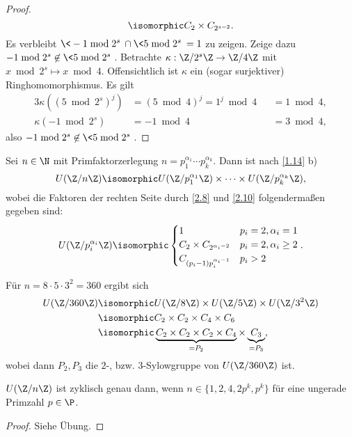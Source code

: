\begin{st}
\begin{proof}
\[			\isomorphic C_2 \times C_{2^{s-2}}.
		\]
		Es verbleibt $\<-1 \bmod 2^s\> \cap \<5 \bmod 2^s\> = 1$ zu zeigen.
		Zeige dazu $-1 \bmod 2^s \not\in \< 5 \bmod 2^s \>$.
		Betrachte $\kappa: \Z / 2^s \Z \to \Z / 4 \Z$ mit $x \bmod 2^s \mapsto x \bmod 4$.
		Offensichtlich ist $\kappa$ ein (sogar surjektiver) Ringhomomorphismus.
		Es gilt
		\begin{alignat*}{3}
			\kappa((5 \bmod 2^s)^j) &= (5 \bmod 4)^j = 1^j \bmod 4 &&= 1 \bmod 4, \\
			\kappa(-1 \bmod 2^s) &= -1 \bmod 4 &&= 3 \bmod 4,
		\end{alignat*}
		also $-1 \bmod 2^s \not\in \< 5 \bmod 2^s\>$.
	\end{proof}
\end{st}

\begin{kor} \label{2.11}
	Sei $n \in \N$ mit Primfaktorzerlegung $n = p_1^{\alpha_1} \dotsb p_k^{\alpha_k}$.
	Dann ist nach \ref{1.14} b)
	\[
		U(\Z / n\Z) \isomorphic U(\Z / p_1^{\alpha_1}\Z) \times \dotsb \times U(\Z / p_k^{\alpha_k} \Z),
	\]
	wobei die Faktoren der rechten Seite durch \ref{2.8} und \ref{2.10} folgendermaßen gegeben sind:
	\[
		U(\Z / p_i^{\alpha_i} \Z)
		\isomorphic \begin{cases}
			1 & p_i = 2, \alpha_i = 1 \\
			C_2 \times C_{2^{\alpha_i - 2}} & p_i = 2, \alpha_i \ge 2 \\
			C_{(p_i-1)p_i^{\alpha_i - 1}} & p_i > 2
		\end{cases}.
	\]
\end{kor}

\begin{ex*}
	Für $n = 8 \cdot 5 \cdot 3^2 = 360$ ergibt sich
	\begin{align*}
		U(\Z / 360 \Z)
		&\isomorphic U(\Z / 8 \Z) \times U(\Z / 5 \Z) \times U(\Z / 3^2 \Z) \\
		&\isomorphic C_2 \times C_2 \times C_4 \times C_6 \\
		&\isomorphic \underbrace{C_2 \times C_2 \times C_2 \times  C_4}_{=P_2} \times \underbrace{C_3}_{=P_3},
	\end{align*}
	wobei dann $P_2, P_3$ die $2$-, bzw. $3$-Sylowgruppe von $U(\Z / 360 \Z)$ ist.
\end{ex*}

\begin{kor} \label{2.12}
	$U(\Z / n\Z)$ ist zyklisch genau dann, wenn $n \in \{1, 2, 4, 2p^k, p^k \}$ für eine ungerade Primzahl $p \in \P$.
	\begin{proof}
		Siehe Übung.
		\Exercise
	\end{proof}
\end{kor}


